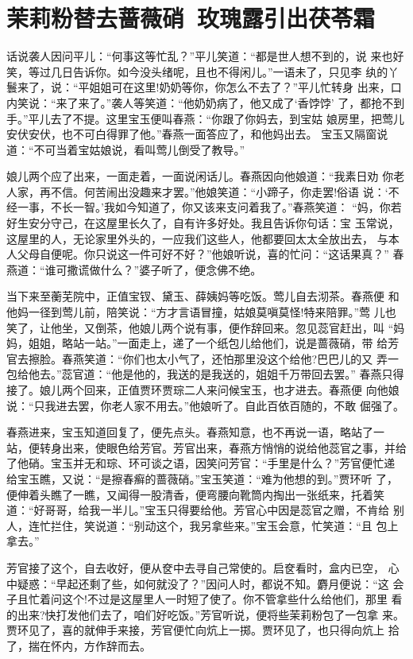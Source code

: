 \chapter{茉莉粉替去蔷薇硝~玫瑰露引出茯苓霜}

话说袭人因问平儿：“何事这等忙乱？”平儿笑道：“都是世人想不到的，说
来也好笑，等过几日告诉你。如今没头绪呢，且也不得闲儿。”一语未了，只见李
纨的丫鬟来了，说：“平姐姐可在这里!奶奶等你，你怎么不去了？”平儿忙转身
出来，口内笑说：“来了来了。”袭人等笑道：“他奶奶病了，他又成了‘香饽饽’
了，都抢不到手。”平儿去了不提。这里宝玉便叫春燕：“你跟了你妈去，到宝姑
娘房里，把莺儿安伏安伏，也不可白得罪了他。”春燕一面答应了，和他妈出去。
宝玉又隔窗说道：“不可当着宝姑娘说，看叫莺儿倒受了教导。”

娘儿两个应了出来，一面走着，一面说闲话儿。春燕因向他娘道：“我素日劝
你老人家，再不信。何苦闹出没趣来才罢。”他娘笑道：“小蹄子，你走罢!俗语
说：‘不经一事，不长一智。’我如今知道了，你又该来支问着我了。”春燕笑道：
“妈，你若好生安分守己，在这屋里长久了，自有许多好处。我且告诉你句话：宝
玉常说，这屋里的人，无论家里外头的，一应我们这些人，他都要回太太全放出去，
与本人父母自便呢。你只说这一件可好不好？”他娘听说，喜的忙问：“这话果真？”
春燕道：“谁可撒谎做什么？”婆子听了，便念佛不绝。

当下来至蘅芜院中，正值宝钗、黛玉、薛姨妈等吃饭。莺儿自去沏茶。春燕便
和他妈一径到莺儿前，陪笑说：“方才言语冒撞，姑娘莫嗔莫怪!特来陪罪。”莺
儿也笑了，让他坐，又倒茶，他娘儿两个说有事，便作辞回来。忽见蕊官赶出，叫
“妈妈，姐姐，略站一站。”一面走上，递了一个纸包儿给他们，说是蔷薇硝，带
给芳官去擦脸。春燕笑道：“你们也太小气了，还怕那里没这个给他?巴巴儿的又
弄一包给他去。”蕊官道：“他是他的，我送的是我送的，姐姐千万带回去罢。”
春燕只得接了。娘儿两个回来，正值贾环贾琮二人来问候宝玉，也才进去。春燕便
向他娘说：“只我进去罢，你老人家不用去。”他娘听了。自此百依百随的，不敢
倔强了。

春燕进来，宝玉知道回复了，便先点头。春燕知意，也不再说一语，略站了一
站，便转身出来，使眼色给芳官。芳官出来，春燕方悄悄的说给他蕊官之事，并给
了他硝。宝玉并无和琮、环可谈之语，因笑问芳官：“手里是什么？”芳官便忙递
给宝玉瞧，又说：“是擦春癣的蔷薇硝。”宝玉笑道：“难为他想的到。”贾环听
了，便伸着头瞧了一瞧，又闻得一股清香，便弯腰向靴筒内掏出一张纸来，托着笑
道：“好哥哥，给我一半儿。”宝玉只得要给他。芳官心中因是蕊官之赠，不肯给
别人，连忙拦住，笑说道：“别动这个，我另拿些来。”宝玉会意，忙笑道：“且
包上拿去。”

芳官接了这个，自去收好，便从奁中去寻自己常使的。启奁看时，盒内已空，
心中疑惑：“早起还剩了些，如何就没了？”因问人时，都说不知。麝月便说：“这
会子且忙着问这个!不过是这屋里人一时短了使了。你不管拿些什么给他们，那里
看的出来?快打发他们去了，咱们好吃饭。”芳官听说，便将些茉莉粉包了一包拿
来。贾环见了，喜的就伸手来接，芳官便忙向炕上一掷。贾环见了，也只得向炕上
拾了，揣在怀内，方作辞而去。

